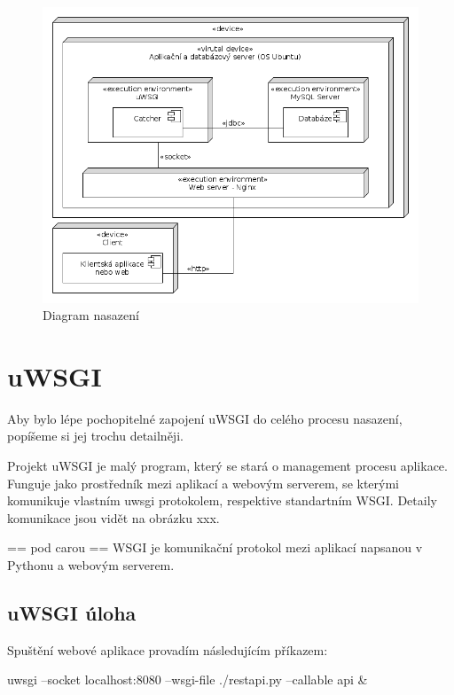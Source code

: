 \begin{figure}[ht!]
\centering
\includegraphics[width=130mm]{./images/diagram-nasazeni.png}
\caption{Diagram nasazení\label{overflow}}
\end{figure}

\section{uWSGI}

Aby bylo lépe pochopitelné zapojení uWSGI do celého procesu nasazení, popíšeme si jej trochu detailněji.

Projekt uWSGI je malý program, který se stará o management procesu aplikace. Funguje jako prostředník mezi aplikací a webovým serverem, se kterými komunikuje vlastním uwsgi protokolem, respektive standartním WSGI. Detaily komunikace jsou vidět na obrázku xxx.


== pod carou ==
WSGI je komunikační protokol mezi aplikací napsanou v Pythonu a webovým serverem.

\subsection{uWSGI úloha}

Spuštění webové aplikace provadím následujícím příkazem:

uwsgi --socket localhost:8080 --wsgi-file ./restapi.py --callable api &


